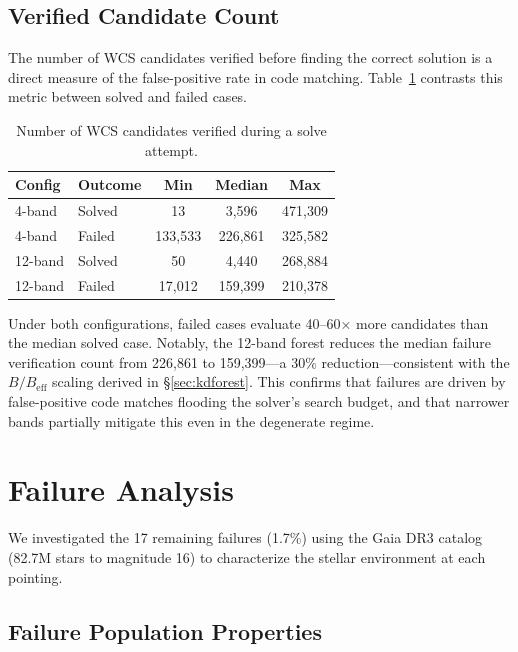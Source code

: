 \documentclass[twocolumn, 10pt]{article}
\begin{document}
\subsection{Verified Candidate Count} \label{sec:candidates}

The number of WCS candidates verified before finding the correct
solution is a direct measure of the false-positive rate in code
matching. Table~\ref{tab:verified} contrasts this metric between
solved and failed cases.

\begin{table}[t]
\centering
\caption{Number of WCS candidates verified during a solve attempt.
\label{tab:verified}}
\setlength{\tabcolsep}{4pt}
\begin{tabular}{@{}llccc@{}}
\toprule
Config & Outcome & Min & Median & Max \\
\midrule
4-band  & Solved  & 13        & 3{,}596   & 471{,}309 \\
4-band  & Failed  & 133{,}533 & 226{,}861 & 325{,}582 \\
\midrule
12-band & Solved  & 50        & 4{,}440   & 268{,}884 \\
12-band & Failed  & 17{,}012  & 159{,}399 & 210{,}378 \\
\bottomrule
\end{tabular}
\end{table}

Under both configurations, failed cases evaluate 40--60$\times$ more
candidates than the median solved case. Notably, the 12-band forest
reduces the median failure verification count from 226{,}861 to
159{,}399---a 30\% reduction---consistent with the $B/B_{\text{eff}}$
scaling derived in \S\ref{sec:kdforest}. This confirms that failures
are driven by false-positive code matches flooding the solver's search
budget, and that narrower bands partially mitigate this even in the
degenerate regime.

\section{Failure Analysis} \label{sec:failure}

We investigated the 17 remaining failures (1.7\%) using the Gaia DR3
catalog (82.7M stars to magnitude 16) to characterize the stellar
environment at each pointing.

\subsection{Failure Population Properties} \label{sec:failprops}
\end{document}
